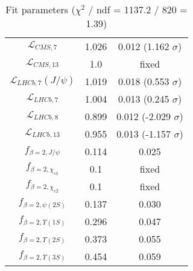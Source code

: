 \begin{table}[h!]
\begin{tabular}{c|c|c}
$\mathcal L_{CMS,7}$ & 1.026 & 0.012 (1.162 $\sigma$) \\
$\mathcal L_{CMS,13}$ & 1.0 & fixed \\
$\mathcal L_{LHCb,7}(J/\psi)$ & 1.019 & 0.018 (0.553 $\sigma$) \\
$\mathcal L_{LHCb,7}$ & 1.004 & 0.013 (0.245 $\sigma$) \\
$\mathcal L_{LHCb,8}$ & 0.899 & 0.012 (-2.029 $\sigma$) \\
$\mathcal L_{LHCb,13}$ & 0.955 & 0.013 (-1.157 $\sigma$) \\
$f_{\beta=2,J/\psi}$ & 0.114 & 0.025 \\
$f_{\beta=2,\chi_{c1}}$ & 0.1 & fixed \\
$f_{\beta=2,\chi_{c2}}$ & 0.1 & fixed \\
$f_{\beta=2,\psi(2S)}$ & 0.137 & 0.030 \\
$f_{\beta=2,\Upsilon(1S)}$ & 0.296 & 0.047 \\
$f_{\beta=2,\Upsilon(2S)}$ & 0.373 & 0.055 \\
$f_{\beta=2,\Upsilon(3S)}$ & 0.454 & 0.059 \\
\end{tabular}
\caption{Fit parameters ($\chi^2$ / ndf = 1137.2 / 820 = 1.39)}
\end{table}
